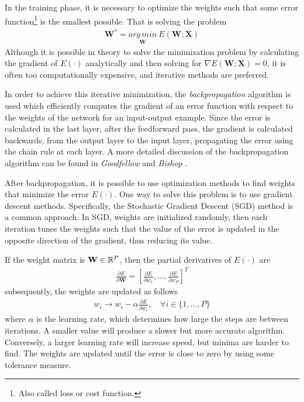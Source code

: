 In the training phase, it is necessary to optimize the weights such that some error function\footnote{Also called loss or cost function.} is the smallest possible. That is solving the problem 
\begin{align*}
    \mathbf{W}^*=\underset{\mathbf{W}}{arg\,min}\:E(\mathbf{W};\mathbf{X})
\end{align*}
Although it is possible in theory to solve the minimization problem by calculating the gradient of $E(\cdot)$ analytically and then solving for $\nabla E(\mathbf{W};\mathbf{X})=0$, it is often too computationally expensive, and iterative methods are preferred. 

In order to achieve this iterative minimization, the \textit{backpropagation} algorithm is used which efficiently computes the gradient of an error function with respect to the weights of the network for an input-output example. Since the error is calculated in the last layer, after the feedforward pass, the gradient is calculated backwards, from the output layer to the input layer, propagating the error using the chain rule at each layer. A more detailed discussion of the backpropagation algorithm can be found in \textit{Goodfellow} and \textit{Bishop} \cite{dl-book, bishop}.

After backpropagation, it is possible to use optimization methods to find weights that minimize the error $E(\cdot)$. One way to solve this problem is to use gradient descent methods. Specifically, the Stochastic Gradient Descent (SGD) method is a common approach. In SGD, weights are initialized randomly, then each iteration tunes the weights such that the value of the error is updated in the opposite direction of the gradient, thus reducing its value.

If the weight matrix is $\mathbf{W} \in \mathbb{R}^P$, then the partial derivatives of $E(\cdot)$ are
\begin{align*}
    \frac{\partial E}{\partial \mathbf{W}}=\left[\frac{\partial E}{\partial w_1}, \ldots, \frac{\partial E}{\partial w_P}\right]^T
\end{align*}
subsequently, the weights are updated as follows
\begin{align}
    w_i \xrightarrow{} w_i - \alpha \frac{\partial E}{\partial w_i},\quad \forall i \in \{1,\ldots, P\} 
    \label{eq:sgd}
\end{align}
where $\alpha$ is the learning rate, which determines how large the steps are between iterations. A smaller value will produce a slower but more accurate algorithm. Conversely, a larger learning rate will increase speed, but minima are harder to find. The weights are updated until the error is close to zero by using some tolerance measure.

